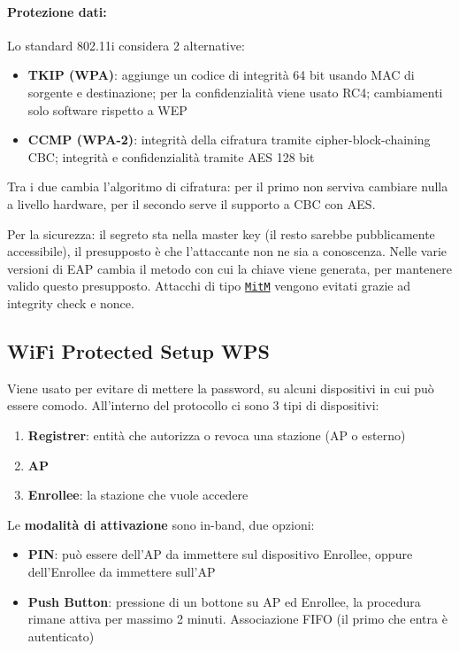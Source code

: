 \paragraph{Protezione dati:} Lo standard 802.11i considera 2 alternative: 
\begin{itemize}
	\item \textbf{TKIP (WPA)}: aggiunge un codice di integrità 64 bit usando MAC di sorgente e destinazione; per la confidenzialità viene usato RC4; cambiamenti solo software rispetto a WEP

	\item \textbf{CCMP (WPA-2)}: integrità della cifratura tramite cipher-block-chaining CBC; integrità e confidenzialità tramite AES 128 bit
\end{itemize}

Tra i due cambia l'algoritmo di cifratura: per il primo non serviva cambiare nulla a livello hardware, per il secondo serve il supporto a CBC con AES.

Per la sicurezza: il segreto sta nella master key (il resto sarebbe pubblicamente accessibile), il presupposto è che l'attaccante non ne sia a conoscenza. Nelle varie versioni di EAP cambia il metodo con cui la chiave viene generata, per mantenere valido questo presupposto. Attacchi di tipo \href{https://it.wikipedia.org/wiki/Attacco_man_in_the_middle}{\texttt{MitM}} vengono evitati grazie ad integrity check e nonce.

\subsection{WiFi Protected Setup WPS}

Viene usato per evitare di mettere la password, su alcuni dispositivi in cui può essere comodo. All'interno del protocollo ci sono 3 tipi di dispositivi: 
\begin{enumerate}
	\item \textbf{Registrer}: entità che autorizza o revoca una stazione (AP o esterno)

	\item \textbf{AP}

	\item \textbf{Enrollee}: la stazione che vuole accedere
\end{enumerate}

Le \textbf{modalità di attivazione} sono in-band, due opzioni: 
\begin{itemize}
	\item \textbf{PIN}: può essere dell'AP da immettere sul dispositivo Enrollee, oppure dell'Enrollee da immettere sull'AP

	\item \textbf{Push Button}: pressione di un bottone su AP ed Enrollee, la procedura rimane attiva per massimo 2 minuti. Associazione FIFO (il primo che entra è autenticato)
\end{itemize}

